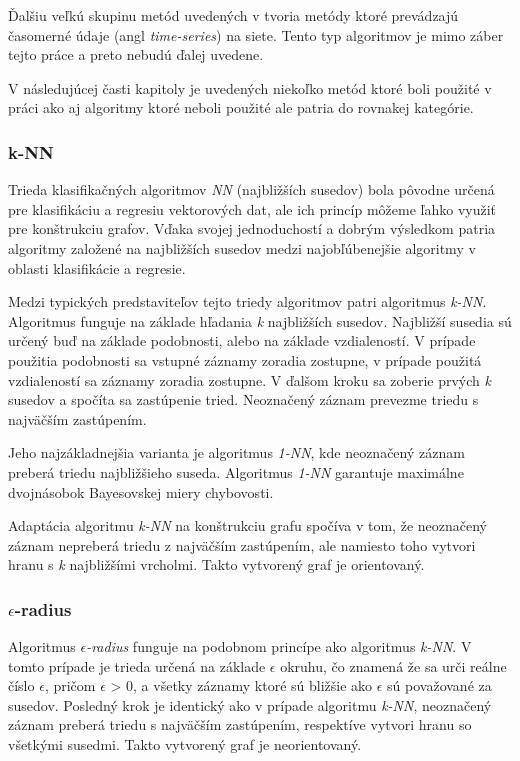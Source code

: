 \documentclass[slovak,master,dept460,male,cpp,cpdeclaration]{diploma}
\begin{document}
Ďalšiu veľkú skupinu metód uvedených v \cite{godbook} tvoria metódy ktoré prevádzajú časomerné  údaje (angl \textit{time-series}) na siete. Tento typ algoritmov je mimo záber tejto práce a preto nebudú ďalej uvedene.

V následujúcej časti kapitoly  je uvedených niekoľko metód ktoré boli použité v práci ako aj algoritmy ktoré neboli použité ale patria do rovnakej kategórie.

\subsubsection{k-NN}
Trieda klasifikačných algoritmov \textit{NN} (najbližších susedov) bola pôvodne určená pre klasifikáciu a regresiu vektorových dat, ale ich princíp môžeme ľahko využiť pre konštrukciu grafov. Vďaka svojej jednoduchostí a dobrým výsledkom patria algoritmy založené na najbližších susedov medzi najobľúbenejšie algoritmy v oblasti klasifikácie a regresie.

Medzi typických predstaviteľov tejto triedy algoritmov patri algoritmus \textit{k-NN}.
Algoritmus funguje na základe hľadania \textit{k} najbližších susedov. Najbližší susedia sú určený buď na základe podobnosti, alebo na základe vzdialeností. V prípade použitia podobnosti sa vstupné záznamy zoradia zostupne, v prípade použitá vzdialeností sa záznamy zoradia zostupne. V ďalšom kroku sa zoberie prvých \textit{k} susedov a spočíta sa zastúpenie tried. Neoznačený záznam prevezme triedu s najväčším zastúpením.

Jeho najzákladnejšia varianta je algoritmus \textit{1-NN}, kde neoznačený záznam preberá triedu najbližšieho suseda. Algoritmus \textit{1-NN} garantuje maximálne dvojnásobok Bayesovskej miery chybovosti.

Adaptácia algoritmu \textit{k-NN} na konštrukciu grafu spočíva v tom, že neoznačený záznam nepreberá triedu z najväčším zastúpením, ale namiesto toho vytvori hranu s \textit{k} najbližšími vrcholmi. Takto vytvorený graf je orientovaný. 

\subsubsection{$\epsilon$-radius}
Algoritmus \textit{$\epsilon$-radius} funguje na podobnom princípe ako algoritmus \textit{k-NN}. V tomto prípade je trieda určená na základe $\epsilon$ okruhu, čo znamená že sa urči reálne číslo  \textit{$\epsilon$}, pričom \textit{$\epsilon$} > 0, a všetky záznamy ktoré sú bližšie ako $\epsilon$ sú považované za susedov. Posledný krok je identický ako v prípade algoritmu \textit{k-NN}, neoznačený záznam preberá triedu s najväčším zastúpením, respektíve vytvori hranu so všetkými susedmi. Takto vytvorený graf je neorientovaný. 
\end{document}
